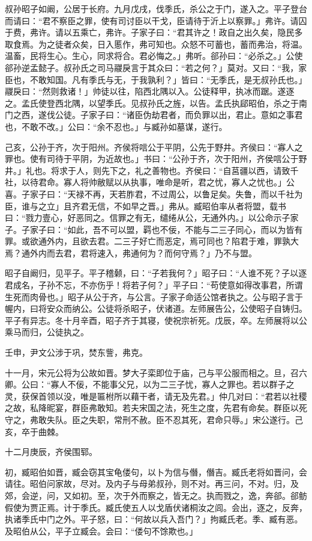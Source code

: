 \documentclass[]{article}
\begin{document}
叔孙昭子如阚，公居于长府。九月戊戌，伐季氏，杀公之于门，遂入之。平子登台而请曰：``君不察臣之罪，使有司讨臣以干戈，臣请待于沂上以察罪。」弗许。请囚于费，弗许。请以五乘亡，弗许。子家子曰：``君其许之！政自之出久矣，隐民多取食焉。为之徒者众矣，日入慝作，弗可知也。众怒不可蓄也，蓄而弗治，将温。温畜，民将生心。生心，同求将合。君必悔之。」弗听。郤孙曰：``必杀之。」公使郤孙逆孟懿子。叔孙氏之司马鬷戾言于其众曰：``若之何？」莫对。又曰：``我，家臣也，不敢知国。凡有季氏与无，于我孰利？」皆曰：``无季氏，是无叔孙氏也。」鬷戾曰：``然则救诸！」帅徒以往，陷西北隅以入。公徒释甲，执冰而踞。遂逐之。孟氏使登西北隅，以望季氏。见叔孙氏之旌，以告。孟氏执郈昭伯，杀之于南门之西，遂伐公徒。子家子曰：``诸臣伪劫君者，而负罪以出，君止。意如之事君也，不敢不改。」公曰：``余不忍也。」与臧孙如墓谋，遂行。

己亥，公孙于齐，次于阳州。齐侯将唁公于平阴，公先于野井。齐侯曰：``寡人之罪也。使有司待于平阴，为近故也。」书曰：``公孙于齐，次于阳州，齐侯唁公于野井。」礼也。将求于人，则先下之，礼之善物也。齐侯曰：``自莒疆以西，请致千社，以待君命。寡人将帅敝赋以从执事，唯命是听，君之忧，寡人之忧也。」公喜。子家子曰：``天禄不再，天若胙君，不过周公，以鲁足矣。失鲁，而以千社为臣，谁与之立」且齐君无信，不如早之晋。」弗从。臧昭伯率从者将盟，载书曰：``戮力壹心，好恶同之。信罪之有无，缱绻从公，无通外内。」以公命示子家子。子家子曰：``如此，吾不可以盟，羁也不佞，不能与二三子同心，而以为皆有罪。或欲通外内，且欲去君。二三子好亡而恶定，焉可同也？陷君于难，罪孰大焉？通外内而去君，君将速入，弗通何为？而何守焉？」乃不与盟。

昭子自阚归，见平子。平子稽颡，曰：``子若我何？」昭子曰：``人谁不死？子以逐君成名，子孙不忘，不亦伤乎！将若子何？」平子曰：``苟使意如得改事君，所谓生死而肉骨也。」昭子从公于齐，与公言。子家子命适公馆者执之。公与昭子言于幄内，曰将安众而纳公。公徒将杀昭子，伏诸道。左师展告公，公使昭子自铸归。平子有异志。冬十月辛酉，昭子齐于其寝，使祝宗祈死。戊辰，卒。左师展将以公乘马而归，公徒执之。

壬申，尹文公涉于巩，焚东訾，弗克。

十一月，宋元公将为公故如晋。梦大子栾即位于庙，己与平公服而相之。旦，召六卿。公曰：``寡人不佞，不能事父兄，以为二三子忧，寡人之罪也。若以群子之灵，获保首领以没，唯是匾柎所以藉干者，请无及先君。」仲几对曰：``君若以社稷之故，私降昵宴，群臣弗敢知。若夫宋国之法，死生之度，先君有命矣。群臣以死守之，弗敢失队。臣之失职，常刑不赦。臣不忍其死，君命只辱。」宋公遂行。己亥，卒于曲棘。

十二月庚辰，齐侯围郓。

初，臧昭伯如晋，臧会窃其宝龟偻句，以卜为信与僭，僭吉。臧氏老将如晋问，会请往。昭伯问家故，尽对。及内子与母弟叔孙，则不对。再三问，不对。归，及郊，会逆，问，又如初。至，次于外而察之，皆无之。执而戮之，逸，奔郤。郤鲂假使为贾正焉。计于季氏。臧氏使五人以戈盾伏诸桐汝之闾。会出，逐之，反奔，执诸季氏中门之外。平子怒，曰：``何故以兵入吾门？」拘臧氏老。季、臧有恶。及昭伯从公，平子立臧会。会曰：``偻句不馀欺也。」
\end{document}
